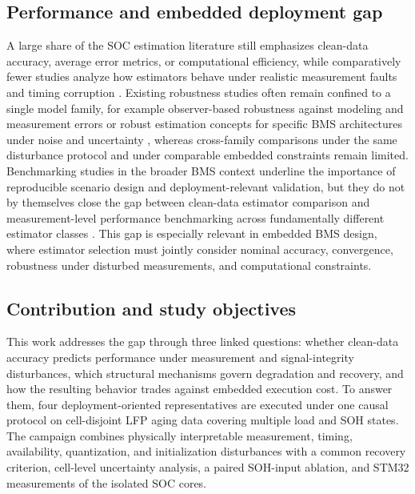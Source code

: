\documentclass[review,nopreprintline]{elsarticle}
\begin{document}
\subsection{Performance and embedded deployment gap}
A large share of the SOC estimation literature still emphasizes clean-data accuracy, average error metrics, or computational efficiency, while comparatively fewer studies analyze how estimators behave under realistic measurement faults and timing corruption \cite{shrivastavaReviewTechnologicalAdvancement2023,Embedded_AI_only_SOC_mobile,giazitzisCaseStudyTiny2024,mazziStateChargeEstimation2022}. Existing robustness studies often remain confined to a single model family, for example observer-based robustness against modeling and measurement errors \cite{liRobustnessSOCEstimation2015} or robust estimation concepts for specific BMS architectures under noise and uncertainty \cite{naseriReliableWirelessBMS2025}, whereas cross-family comparisons under the same disturbance protocol and under comparable embedded constraints remain limited. Benchmarking studies in the broader BMS context underline the importance of reproducible scenario design and deployment-relevant validation, but they do not by themselves close the gap between clean-data estimator comparison and measurement-level performance benchmarking across fundamentally different estimator classes \cite{bergerBenchmarkingBatteryManagement2024}. This gap is especially relevant in embedded BMS design, where estimator selection must jointly consider nominal accuracy, convergence, robustness under disturbed measurements, and computational constraints.

\subsection{Contribution and study objectives}
This work addresses the gap through three linked questions: whether clean-data accuracy predicts performance under measurement and signal-integrity disturbances, which structural mechanisms govern degradation and recovery, and how the resulting behavior trades against embedded execution cost. To answer them, four deployment-oriented representatives are executed under one causal protocol on cell-disjoint LFP aging data covering multiple load and SOH states. The campaign combines physically interpretable measurement, timing, availability, quantization, and initialization disturbances with a common recovery criterion, cell-level uncertainty analysis, a paired SOH-input ablation, and STM32 measurements of the isolated SOC cores.
\end{document}
